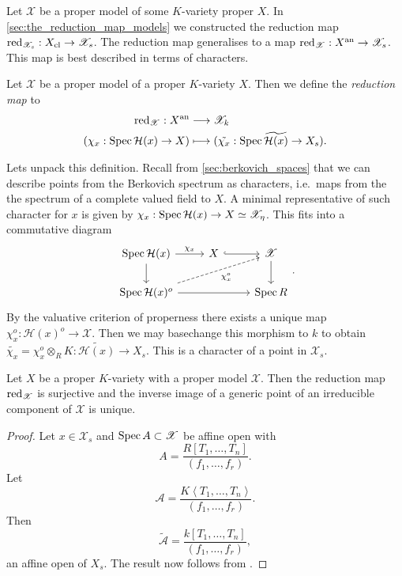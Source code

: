 Let $\mathscr X$ be a proper model of some $K$-variety proper $X$.
In \cref{sec:the_reduction_map_models} we constructed the reduction map $\operatorname{red}_{\mathscr X_s}: X_\text{cl}  \to \mathscr X_s$. 
The reduction map generalises to a map $\operatorname{red}_{\mathscr X}: X{}^{\text{an}} \to \mathscr X_s$.
This map is best described in terms of characters. 
\begin{definition}
	Let $\mathscr X$ be a proper model of a proper $K$-variety $X$. 
	Then we define the \emph{reduction map} to 
	\begin{align*}
		\operatorname{red}_{\mathscr X}:  X{}^{\text{an}} &\longrightarrow \mathscr X_k \\
		(\chi_x: \operatorname{Spec} \mathcal H(x) \to X) &\longmapsto (\tilde{\chi_x}: \operatorname{Spec} \widetilde{\mathcal H (x)} \to X_s)
	.\end{align*}
\end{definition}
Lets unpack this definition. 
Recall from \cref{sec:berkovich_spaces} that we can describe points from the Berkovich spectrum as characters, i.e.\ maps from the the spectrum of a complete valued field to $X$.
A minimal representative of such character for $x$ is given by $\chi_x: \operatorname{Spec} \mathcal{H} (x) \to X \simeq \mathscr X_\eta$. 
This fits into a commutative diagram \[
\begin{tikzcd}
	\spec \mathcal{H} (x) \dar \rar{\chi_x} & X \rar[hookrightarrow] & \mathscr X \dar \\ 
	\spec \mathcal{H} (x)^{o} \ar[dashed]{urr}[']{\chi_x^{o}} \ar{rr} & & \spec R
\end{tikzcd}
.\] 
By the valuative criterion of properness there exists a unique map $\chi_x^{o}: \mathcal{H} (x)^{o} \to \mathscr X$. 
Then we may basechange this morphism to  $k$ to obtain $\widetilde{\chi_x} = \chi_x^{o} \otimes_R K: \widetilde{\mathcal{H} (x)} \to X_s$. 
This is a character of a point in $\mathscr X_s$. 


\begin{proposition}
	Let $X$ be a proper $K$-variety with a proper model $\mathscr X$. 
	Then the reduction map  $\operatorname{red}_{\mathscr X}$ is surjective and the inverse image of a generic point of an irreducible component of $\mathscr X$ is unique. 
\end{proposition}
\begin{proof}
	Let $x \in \mathscr X_s$ and  $\operatorname{Spec} A \subset \mathscr X$ be affine open with \[
		A = \frac{R[T_1, \ldots, T_n]}{(f_1, \ldots, f_r)}
	.\] 
	Let \[
		\mathcal{A}  = \frac{K\left<T_1, \ldots, T_n \right>}{(f_1, \ldots, f_r)}
	.\] 
	Then \[
		\widetilde{\mathcal{A} } = \frac{k[T_1,\ldots, T_n]}{(f_1, \ldots, f_r)}
	,\]  
	an affine open of $X_s$. 
	The result now follows from \cite[prop.\ 2.4.4]{berkovichSpectralTheoryAnalytic2012}.
\end{proof}



